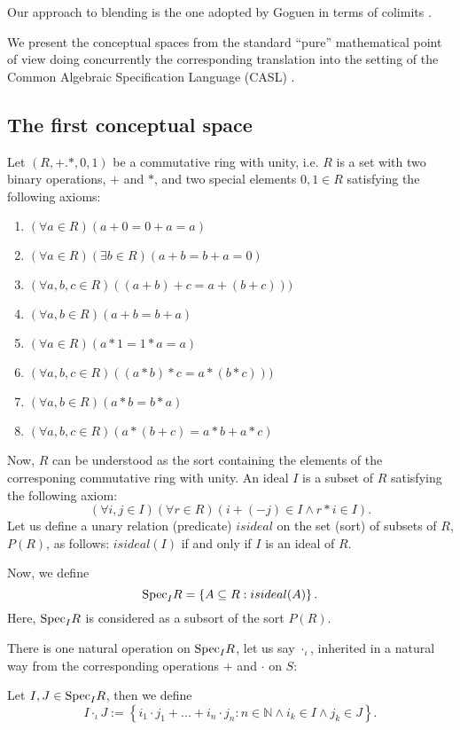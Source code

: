 Our approach to blending is the one adopted by Goguen in terms of
colimits  \parencite{Gog99,Goguen01,Goguen05c}.

We present the conceptual spaces from the standard ``pure''
mathematical point of view doing concurrently the corresponding
translation into the setting of the Common Algebraic Specification
Language (CASL) \cite{BidoitMosses2004}.
\subsection{The first conceptual space}
Let $(R,+.*,0,1)$ be a commutative ring with unity, i.e. $R$ is a set with two binary operations, $+$ and $*$, and two special elements $0,1\in R$ satisfying the following axioms:
\begin{enumerate}
\item $(\forall a\in R)(a+0=0+a=a)$
\item $(\forall a\in R)(\exists b\in R)(a+b=b+a=0)$
\item $(\forall a,b,c \in R)((a+b)+c=a+(b+c)))$
\item $(\forall a,b \in R)(a+b=b+a)$
\item $(\forall a\in R)(a*1=1*a=a)$
\item $(\forall a,b,c \in R)((a*b)*c=a*(b*c)))$
\item $(\forall a,b \in R)(a*b=b*a)$
\item $(\forall a,b,c \in R)(a*(b+c)=a*b+a*c)$
\end{enumerate}
Now, $R$ can be understood as the sort containing the elements of the corresponing commutative ring with unity.
An ideal $I$ is a subset of $R$ satisfying the following axiom:
\[(\forall i,j\in I)(\forall r\in R)(i+(-j)\in I \wedge r*i\in I).\]
\newline\indent 
Let us define a unary relation (predicate) $isideal$ on the set (sort) of subsets of $R$, $P(R)$, as follows:
$isideal(I)$ if and only if $I$ is an ideal of $R$.

Now, we define
\[{\rm Spec}_IR=\left\{A\subseteq R: isideal(A) \right\}.\]
Here, ${\rm Spec}_IR$ is considered as a subsort of the sort $P(R)$.

There is one natural operation on ${\rm Spec}_IR$, let us say $\cdot_{\iota}$, inherited in a natural way from the corresponding operations $+$ and $\cdot$ on $S$:

 Let $I,J\in {\rm Spec}_IR$, then we define 
%
\[I\cdot_{\iota} J:=\left\{i_1\cdot j_1+...+i_n\cdot j_n:n \in \mathbb{N} \wedge i_k\in I \wedge j_k\in J \right\}.\]

